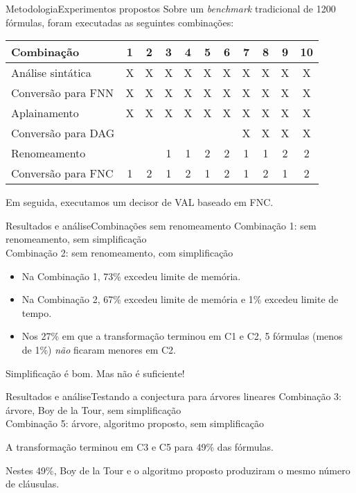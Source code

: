 \begin{frame}{Metodologia}{Experimentos propostos}
	Sobre um \textit{benchmark} tradicional de 1200 fórmulas, foram executadas as seguintes combinações:
	
	\pause
	\vspace{.5cm}
	\begin{tabular}{l|cccccccccc}
		Combinação         & 1 & 2 & 3 & 4 & 5 & 6 & 7 & 8 & 9 & 10 \\ \hline
		Análise sintática  & X & X & X & X & X & X & X & X & X & X  \\
		Conversão para FNN & X & X & X & X & X & X & X & X & X & X  \\
		Aplainamento       & X & X & X & X & X & X & X & X & X & X  \\
		Conversão para DAG &   &   &   &   &   &   & X & X & X & X  \\
		Renomeamento       &   &   & 1 & 1 & 2 & 2 & 1 & 1 & 2 & 2  \\
		Conversão para FNC & 1 & 2 & 1 & 2 & 1 & 2 & 1 & 2 & 1 & 2  \\
	\end{tabular}
	
	\vspace{.4cm}
	\pause Em seguida, executamos um decisor de VAL baseado em FNC.
\end{frame}

\begin{frame}{Resultados e análise}{Combinações sem renomeamento}
	Combinação 1: sem renomeamento, sem simplificação\\
	Combinação 2: sem renomeamento, com simplificação
	
	\begin{itemize}
		\pause\item Na Combinação 1, 73\% excedeu limite de memória.
		\pause\item Na Combinação 2, 67\% excedeu limite de memória e 1\% excedeu limite de tempo.
		\pause\item Nos 27\% em que a transformação terminou em C1 e C2, 5 fórmulas (menos de 1\%) \emph{não} ficaram menores em C2.
	\end{itemize}
	
	\pause Simplificação é bom. \pause Mas não é suficiente!
\end{frame}

\begin{frame}{Resultados e análise}{Testando a conjectura para árvores lineares}
	Combinação 3: árvore, Boy de la Tour, sem simplificação\\
	Combinação 5: árvore, algoritmo proposto, sem simplificação
	
	\pause A transformação terminou em C3 e C5 para 49\% das fórmulas.
	
	\pause Nestes 49\%, Boy de la Tour e o algoritmo proposto produziram o mesmo número de cláusulas.
\end{frame}

